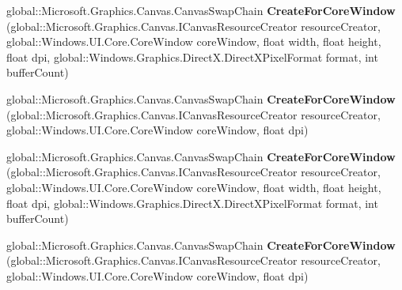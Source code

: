 \begin{DoxyCompactItemize}
\item 
\mbox{\label{interface_microsoft_1_1_graphics_1_1_canvas_1_1_i_canvas_swap_chain_statics_afb12532100a3740af7bfec62008c5172}} 
global\+::\+Microsoft.\+Graphics.\+Canvas.\+Canvas\+Swap\+Chain {\bfseries Create\+For\+Core\+Window} (global\+::\+Microsoft.\+Graphics.\+Canvas.\+I\+Canvas\+Resource\+Creator resource\+Creator, global\+::\+Windows.\+U\+I.\+Core.\+Core\+Window core\+Window, float width, float height, float dpi, global\+::\+Windows.\+Graphics.\+Direct\+X.\+Direct\+X\+Pixel\+Format format, int buffer\+Count)
\item 
\mbox{\label{interface_microsoft_1_1_graphics_1_1_canvas_1_1_i_canvas_swap_chain_statics_a6a0db7b5454320836bd36df271776cea}} 
global\+::\+Microsoft.\+Graphics.\+Canvas.\+Canvas\+Swap\+Chain {\bfseries Create\+For\+Core\+Window} (global\+::\+Microsoft.\+Graphics.\+Canvas.\+I\+Canvas\+Resource\+Creator resource\+Creator, global\+::\+Windows.\+U\+I.\+Core.\+Core\+Window core\+Window, float dpi)
\item 
\mbox{\label{interface_microsoft_1_1_graphics_1_1_canvas_1_1_i_canvas_swap_chain_statics_afb12532100a3740af7bfec62008c5172}} 
global\+::\+Microsoft.\+Graphics.\+Canvas.\+Canvas\+Swap\+Chain {\bfseries Create\+For\+Core\+Window} (global\+::\+Microsoft.\+Graphics.\+Canvas.\+I\+Canvas\+Resource\+Creator resource\+Creator, global\+::\+Windows.\+U\+I.\+Core.\+Core\+Window core\+Window, float width, float height, float dpi, global\+::\+Windows.\+Graphics.\+Direct\+X.\+Direct\+X\+Pixel\+Format format, int buffer\+Count)
\item 
\mbox{\label{interface_microsoft_1_1_graphics_1_1_canvas_1_1_i_canvas_swap_chain_statics_a6a0db7b5454320836bd36df271776cea}} 
global\+::\+Microsoft.\+Graphics.\+Canvas.\+Canvas\+Swap\+Chain {\bfseries Create\+For\+Core\+Window} (global\+::\+Microsoft.\+Graphics.\+Canvas.\+I\+Canvas\+Resource\+Creator resource\+Creator, global\+::\+Windows.\+U\+I.\+Core.\+Core\+Window core\+Window, float dpi)
\item 
\mbox{\label{interface_microsoft_1_1_graphics_1_1_canvas_1_1_i_canvas_swap_chain_statics_afb12532100a3740af7bfec62008c5172}} 

\end{DoxyCompactItemize}
